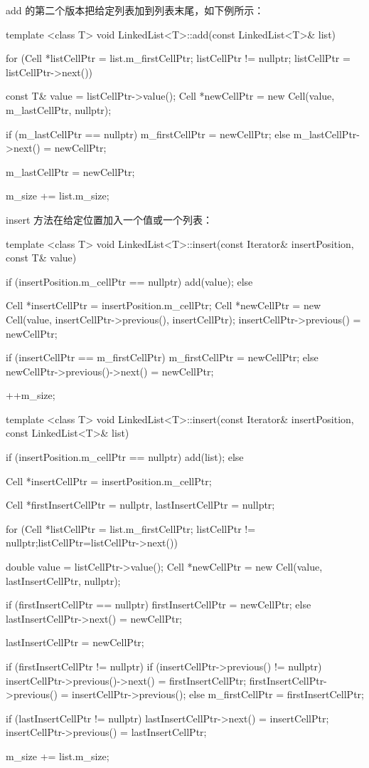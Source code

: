 add 的第二个版本把给定列表加到列表末尾，如下例所示：

\begin{codebox}
template <class T>
void LinkedList<T>::add(const LinkedList<T>& list) {
  for (Cell *listCellPtr = list.m_firstCellPtr;
       listCellPtr != nullptr; listCellPtr = listCellPtr->next()) {
    const T& value = listCellPtr->value();
    Cell *newCellPtr = new Cell(value, m_lastCellPtr, nullptr);

    if (m_lastCellPtr == nullptr) {
      m_firstCellPtr = newCellPtr;
    }
    else {
      m_lastCellPtr->next() = newCellPtr;
    }

    m_lastCellPtr = newCellPtr;
  }

  m_size += list.m_size;
}
\end{codebox}

insert 方法在给定位置加入一个值或一个列表：

\begin{codebox}
template <class T>
void LinkedList<T>::insert(const Iterator& insertPosition,
                           const T& value) {
  if (insertPosition.m_cellPtr == nullptr) {
    add(value);
  }
  else {
    Cell *insertCellPtr = insertPosition.m_cellPtr;
    Cell *newCellPtr =
      new Cell(value, insertCellPtr->previous(), insertCellPtr);
    insertCellPtr->previous() = newCellPtr;

    if (insertCellPtr == m_firstCellPtr) {
      m_firstCellPtr = newCellPtr;
    }
    else {
      newCellPtr->previous()->next() = newCellPtr;
    }

    ++m_size;
  }
}

template <class T>
void LinkedList<T>::insert(const Iterator& insertPosition,
                           const LinkedList<T>& list) {
  if (insertPosition.m_cellPtr == nullptr) {
    add(list);
  }
  else {
    Cell *insertCellPtr = insertPosition.m_cellPtr;

    Cell *firstInsertCellPtr = nullptr,
         lastInsertCellPtr = nullptr;

    for (Cell *listCellPtr = list.m_firstCellPtr;
         listCellPtr != nullptr;listCellPtr=listCellPtr->next()) {
      double value = listCellPtr->value();
      Cell *newCellPtr =
        new Cell(value, lastInsertCellPtr, nullptr);

      if (firstInsertCellPtr == nullptr) {
        firstInsertCellPtr = newCellPtr;
      }
      else {
        lastInsertCellPtr->next() = newCellPtr;
      }

      lastInsertCellPtr = newCellPtr;
    }

    if (firstInsertCellPtr != nullptr) {
      if (insertCellPtr->previous() != nullptr) {
        insertCellPtr->previous()->next() = firstInsertCellPtr;
        firstInsertCellPtr->previous() =
          insertCellPtr->previous();
      }
      else {
        m_firstCellPtr = firstInsertCellPtr;
      }
    }

    if (lastInsertCellPtr != nullptr) {
      lastInsertCellPtr->next() = insertCellPtr;
      insertCellPtr->previous() = lastInsertCellPtr;
    }

    m_size += list.m_size;
  }
}
\end{codebox}

